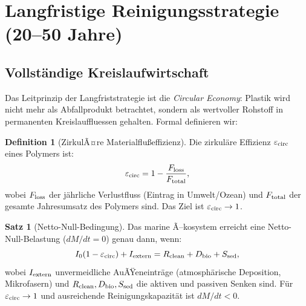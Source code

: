 ﻿\documentclass[12pt,a4paper]{article}
\theoremstyle{definition}
\newtheorem{definition}{Definition}[section]
\newtheorem{theorem}{Satz}[section]
\theoremstyle{remark}
\begin{document}
\section{Langfristige Reinigungsstrategie (20--50 Jahre)}
\label{sec:langfristig}

\subsection{Vollst\"andige Kreislaufwirtschaft}

Das Leitprinzip der Langfriststrategie ist die \textit{Circular Economy}:
Plastik wird nicht mehr als Abfallprodukt betrachtet, sondern als wertvoller
Rohstoff in permanenten Kreislauffluessen gehalten. Formal definieren wir:

\begin{definition}[ZirkulÃ¤re Materialflu\ss{}effizienz]
Die zirkul\"are Effizienz $\varepsilon_{\rm circ}$ eines Polymers ist:
\begin{equation}
  \varepsilon_{\rm circ} = 1 - \frac{F_{\rm loss}}{F_{\rm total}},
  \label{eq:circ_eff}
\end{equation}
wobei $F_{\rm loss}$ der j\"ahrliche Verlustfluss (Eintrag in Umwelt/Ozean)
und $F_{\rm total}$ der gesamte Jahresumsatz des Polymers sind. Das Ziel ist
$\varepsilon_{\rm circ} \to 1$.
\end{definition}

\begin{theorem}[Netto-Null-Bedingung]
Das marine Ã–kosystem erreicht eine Netto-Null-Belastung ($dM/dt = 0$)
genau dann, wenn:
\begin{equation}
  I_0 (1 - \varepsilon_{\rm circ}) + I_{\rm extern} = R_{\rm clean} + D_{\rm bio} + S_{\rm sed},
  \label{eq:netzero}
\end{equation}
wobei $I_{\rm extern}$ unvermeidliche AuÃŸeneintr\"age (atmosph\"arische
Deposition, Mikrofasern) und $R_{\rm clean}, D_{\rm bio}, S_{\rm sed}$
die aktiven und passiven Senken sind. F\"ur $\varepsilon_{\rm circ} \to 1$
und ausreichende Reinigungskapazit\"at ist $dM/dt < 0$.
\end{theorem}
\end{document}
